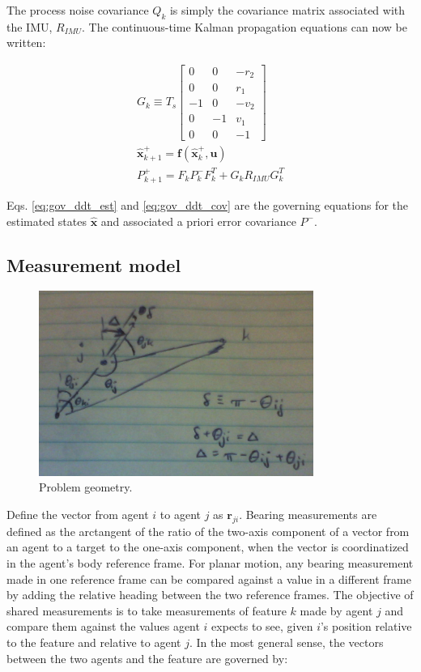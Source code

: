 \documentclass{aiaa-tc}
\newcommand{\B}[1]{\textbf{#1}} %
\begin{document}
The process noise covariance $Q_k$ is simply the covariance matrix associated with the IMU, $R_{IMU}$. The continuous-time Kalman propagation equations can now be written:

\begin{align}
G_k \equiv T_s\begin{bmatrix}
0 & 0 & -r_2 \\0 & 0 & r_1\\
-1 & 0 & -v_2 \\
0 & -1 & v_1 \\
0 & 0 & -1
\end{bmatrix} \\
\hat{\B{x}}_{k+1}^+ = \B{f}(\hat{\B{x}}_k^+,\B{u}) \label{eq:gov_ddt_est}\\
P^{+}_{k+1} = F_kP_k^{-}F_k^T + G_k R_{IMU} G_k^T \label{eq:gov_ddt_cov}
\end{align}

Eqs. \ref{eq:gov_ddt_est} and \ref{eq:gov_ddt_cov} are the governing equations for the estimated states $\hat{\B{x}}$ and associated a priori error covariance $P^-$.

\subsection{Measurement model}

\begin{figure}[tb!]
\centering
\includegraphics[width=0.8\textwidth]{geometry.png}
\caption{Problem geometry.}
\label{fig:geometry}
\end{figure}

Define the vector from agent $i$ to agent $j$ as $\B{r}_{ji}$. Bearing measurements are defined as the arctangent of the ratio of the two-axis component of a vector from an agent to a target to the one-axis component, when the vector is coordinatized in the agent's body reference frame. For planar motion, any bearing measurement made in one reference frame can be compared against a value in a different frame by adding the relative heading between the two reference frames. The objective of shared measurements is to take measurements of feature $k$ made by agent $j$ and compare them against the values agent $i$ expects to see, given $i$'s position relative to the feature and relative to agent $j$. In the most general sense, the vectors between the two agents and the feature are governed by:
\end{document}
